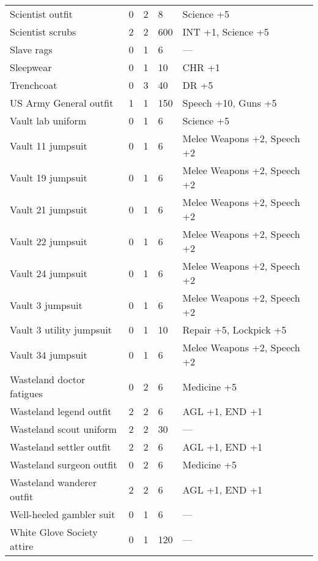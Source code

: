 \documentclass{report}
\begin{document}
\begin{table}[H]
\begin{table}[H]
\begin{table}[H]
\begin{table}[H]
\begin{table}[H]
\begin{table}[H]
\begin{table}[H]
\begin{table}[H]
\begin{table}[H]
\begin{table}[H]
\begin{table}[H]
\begin{table}[H]
\begin{table}[H]
\begin{table}[H]
\begin{table}[H]
\begin{table}[H]
\begin{table}[H]
\begin{table}[H]
\begin{tabular}{p{30mm}p{30mm}p{30mm}p{30mm}p{30mm}}
Scientist outfit  & 0 & 2 & 8 & Science +5  \\
Scientist scrubs  & 2 & 2 & 600 & INT +1, Science +5  \\
Slave rags  & 0 & 1 & 6 & —  \\
Sleepwear  & 0 & 1 & 10 & CHR +1  \\
Trenchcoat  & 0 & 3 & 40 & DR +5  \\
US Army General outfit  & 1 & 1 & 150 & Speech +10, Guns +5  \\
Vault lab uniform  & 0 & 1 & 6 & Science +5  \\
Vault 11 jumpsuit  & 0 & 1 & 6 & Melee Weapons +2, Speech +2  \\
Vault 19 jumpsuit  & 0 & 1 & 6 & Melee Weapons +2, Speech +2  \\
Vault 21 jumpsuit  & 0 & 1 & 6 & Melee Weapons +2, Speech +2  \\
Vault 22 jumpsuit  & 0 & 1 & 6 & Melee Weapons +2, Speech +2  \\
Vault 24 jumpsuit  & 0 & 1 & 6 & Melee Weapons +2, Speech +2  \\
Vault 3 jumpsuit  & 0 & 1 & 6 & Melee Weapons +2, Speech +2  \\
Vault 3 utility jumpsuit  & 0 & 1 & 10 & Repair +5, Lockpick +5  \\
Vault 34 jumpsuit  & 0 & 1 & 6 & Melee Weapons +2, Speech +2  \\
Wasteland doctor fatigues  & 0 & 2 & 6 & Medicine +5  \\
Wasteland legend outfit  & 2 & 2 & 6 & AGL +1, END +1  \\
Wasteland scout uniform  & 2 & 2 & 30 & —  \\
Wasteland settler outfit  & 2 & 2 & 6 & AGL +1, END +1  \\
Wasteland surgeon outfit  & 0 & 2 & 6 & Medicine +5  \\
Wasteland wanderer outfit  & 2 & 2 & 6 & AGL +1, END +1  \\
Well-heeled gambler suit  & 0 & 1 & 6 & —  \\
White Glove Society attire  & 0 & 1 & 120 & —  \\
  \end{tabular}

\end{table}
\end{table}
\end{table}
\end{table}
\end{table}
\end{table}
\end{table}
\end{table}
\end{table}
\end{table}
\end{table}
\end{table}
\end{table}
\end{table}
\end{table}
\end{table}
\end{table}
\end{table}
\end{document}
